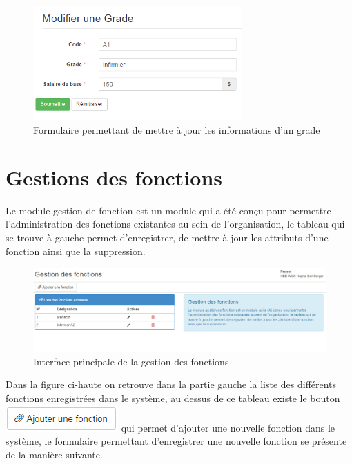 \documentclass[12pt,a4paper]{report}
\begin{document}
\begin{figure}[h]
\begin{center}
\includegraphics[width=8cm]{pic/UpdGrade.png}
\end{center}
\caption{Formulaire permettant de mettre à jour les informations d'un grade}
\label{Formulaire permettant de mettre à jour les informations d'un grade}
\end{figure} 

\section{Gestions des fonctions}
Le module gestion de fonction est un module qui a été conçu pour permettre l'administration des fonctions existantes au sein de l'organisation, le tableau qui se trouve à gauche permet d’enregistrer, de mettre à jour les attributs d'une fonction ainsi que la suppression.
\begin{figure}[h]
\begin{center}
\includegraphics[width=14cm]{pic/GestionFonction.png}
\end{center}
\caption{Interface principale de la gestion des fonctions}
\label{Interface principale de la gestion des fonctions}
\end{figure}

Dans la figure ci-haute on retrouve dans la partie gauche la liste des différents fonctions enregistrées dans le système, au dessus de ce tableau existe le bouton \includegraphics[scale=1]{pic/AddFonction.png} qui permet d'ajouter une nouvelle fonction dans le système, le formulaire permettant d'enregistrer une nouvelle fonction se présente de la manière suivante.
\end{document}
